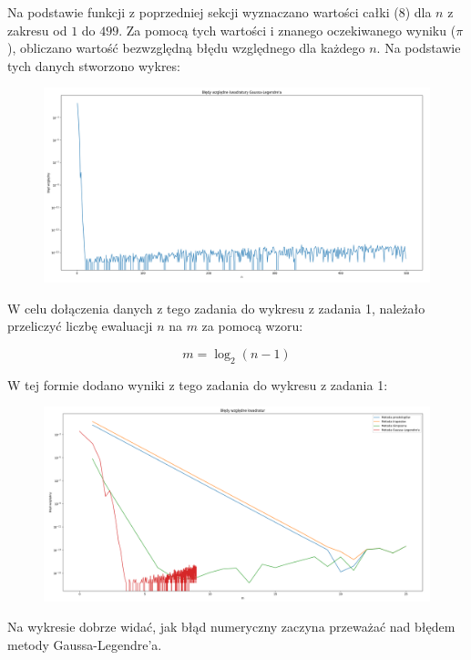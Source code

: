 \documentclass{article}
\begin{document}
	Na podstawie funkcji z poprzedniej sekcji wyznaczano wartości całki (8) dla $n$ z zakresu od $1$ do $499$. Za pomocą tych wartości i znanego oczekiwanego wyniku ($\pi$), obliczano wartość bezwzględną błędu względnego dla każdego $n$. Na podstawie tych danych stworzono wykres:

	\begin{figure}[h]
		\centering
		\includegraphics[scale = 0.2]{wykres3.png}
	\end{figure}


	W celu dołączenia danych z tego zadania do wykresu z zadania 1, należało przeliczyć liczbę ewaluacji $n$ na $m$ za pomocą wzoru:

	\begin{equation}
		m = \log_2 (n - 1)
	\end{equation}


	W tej formie dodano wyniki z tego zadania do wykresu z zadania 1:

	\begin{figure}[h]
		\centering
		\includegraphics[scale = 0.3]{wykres4.png}
	\end{figure}


	Na wykresie dobrze widać, jak błąd numeryczny zaczyna przeważać nad błędem metody Gaussa-Legendre'a.
	
	
	
	
	
	
	
	
	
	
	
	
	
	
	
	
	
	
	
\end{document}
